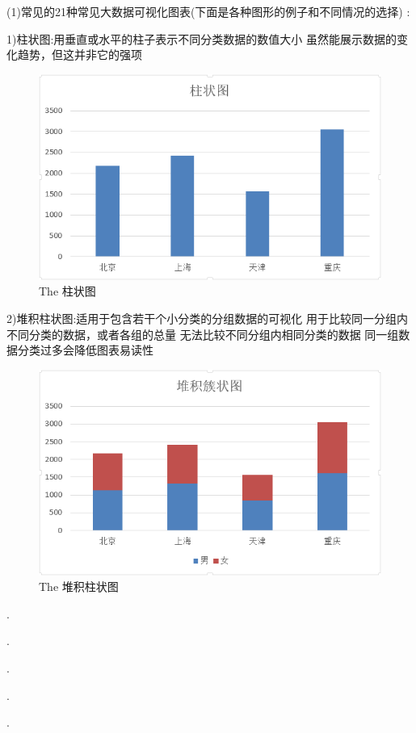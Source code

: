 \documentclass{article}
\begin{document}
\begin{itemize}
    	(1)常见的21种常见大数据可视化图表(下面是各种图形的例子和不同情况的选择) :\par
    		1)柱状图:用垂直或水平的柱子表示不同分类数据的数值大小
    		虽然能展示数据的变化趋势，但这并非它的强项\par
    		\begin{figure}[h!]
    			\centering
    			\includegraphics[scale=0.7]{zhuzhuangtu}
    			\caption{The 柱状图}
    			\label{fig:zhuzhuangtu}
    		\end{figure}
    		2)堆积柱状图:适用于包含若干个小分类的分组数据的可视化
    		用于比较同一分组内不同分类的数据，或者各组的总量
    		无法比较不同分组内相同分类的数据
    		同一组数据分类过多会降低图表易读性\par
    		\begin{figure}[h!]
    			\centering
    			\includegraphics[scale=0.7]{duiji}
    			\caption{The 堆积柱状图}
    			\label{fig:duiji}
    		\end{figure}
    	.\par.\par.\par.\par.\par

\end{itemize}
\end{document}
